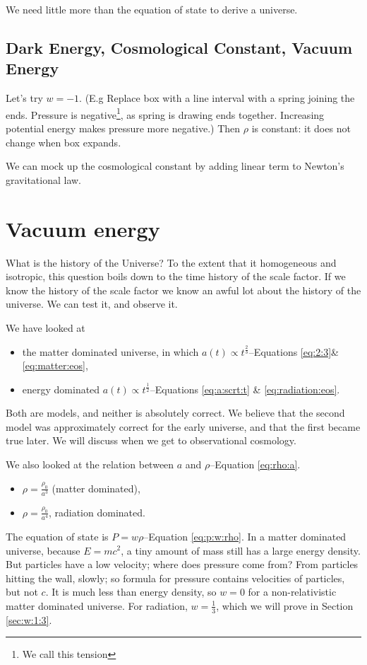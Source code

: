 \documentclass[]{article}
\begin{document}
We need little more than the equation of state to derive a universe.

\subsection{Dark Energy, Cosmological Constant, Vacuum Energy}

Let's try $w=-1$. (E.g Replace box with a line interval with a spring joining the ends. Pressure is negative\footnote{We call this tension}, as spring is drawing ends together. Increasing potential energy makes pressure more negative.) Then $\rho$ is constant: it does not change when box expands.

We can mock up the cosmological constant by adding linear term to Newton's gravitational law.

\section{Vacuum energy}

What is the history of the Universe? To the extent that it homogeneous and isotropic, this question boils down to the time history of the scale factor. If we know the history of the scale factor we know an awful lot about the history of the universe. We can test it, and observe it.

We have looked at \begin{itemize}
	\item the matter dominated universe, in  which $a(t)\propto t^{\frac{2}{3}}$--Equations \eqref{eq:2:3}\&\eqref{eq:matter:eos}, 
	\item energy dominated $a(t)\propto t^\frac{1}{2}$--Equations \eqref{eq:a:scrt:t} \& \eqref{eq:radiation:eos}.
\end{itemize}

Both are models, and neither is absolutely correct. We believe that the second model was approximately correct for the early universe, and that the first became true later. We will discuss when we get to observational cosmology.

We also looked at the relation between $a$ and $\rho$--Equation \eqref{eq:rho:a}. \begin{itemize}
	\item $\rho =\frac{\rho_0}{a^3}$ (matter dominated),
	\item  $\rho =\frac{\rho_0}{a^4}$, radiation dominated.
\end{itemize}

The equation of state is $P = w\rho$--Equation \eqref{eq:p:w:rho}. In a matter dominated universe, because $E=mc^2$, a tiny amount of mass still has a large energy density. But particles have a low velocity; where does pressure come from? From particles hitting the wall, slowly; so formula for pressure contains velocities of particles, but not $c$. It is much less than energy density, so $w=0$ for a non-relativistic matter dominated universe. For radiation, $w=\frac{1}{3}$, which we will prove in Section \ref{sec:w:1:3}.
\end{document}
